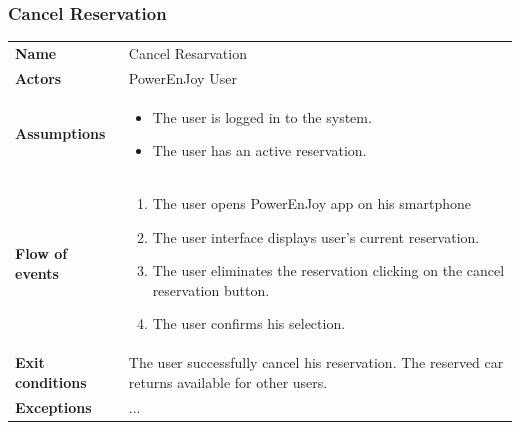 \documentclass[english]{article}
\begin{document}
	\subsubsection{Cancel Reservation}
	\begin{center}
	\begin{tabular}{l||p{10cm}}
	\textbf{Name} 
		& Cancel Resarvation\\ [8px]
	\textbf{Actors} 
		& PowerEnJoy User\\ [8px]
	\textbf{Assumptions} 
		& \begin{itemize}
			\item The user is logged in to the system.
			\item The user has an active reservation.
		\end{itemize}\\
	\textbf{Flow of events}
		& \begin{enumerate}
 			\item The user opens PowerEnJoy app on his smartphone 
 			\item The user interface displays user's current reservation.
			\item The user eliminates the reservation clicking on the cancel reservation button.
			\item The user confirms his selection.
		\end{enumerate}\\ 
	\textbf{Exit conditions}
		&The user successfully cancel his reservation. The reserved car returns available for other users.\\ [8px]
	\textbf{Exceptions}
		&...\\[8px]
	\end{tabular}
	\end{center}
\end{document}
